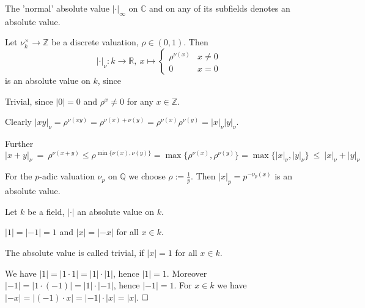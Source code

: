 \documentclass[11pt]{book}
\theoremstyle{nonumberbreak}
\newenvironment{pr}[1][]{\ifthenelse{\equal{#1}{}}{\proof}{\proof[#1]}\rm}{\endproof}
\newenvironment{ex}[1][]{\ifthenelse{\equal{#1}{}}{\example}{\example[#1]}\rm}{\endexample}
\newenvironment{bemdefin}[1][]{\ifthenelse{\equal{#1}{}}{\bemdefini}{\bemdefini[#1]}\rm}{\endbemdefini}
\begin{document}
\begin{spacing}{1.3}
\begin{ex}
\begin{compactenum}
\item The 'normal' absolute value $|\cdot|_{\infty}$ on $\mathbb{C}$ and on any of its subfields denotes an absolute value.
\item Let $\nu_k^{\times} \longrightarrow \mathbb{Z}$ be a discrete valuation, $\rho \in (0,1)$. Then 
$$|\cdot |_{\nu}:k \longrightarrow \mathbb{R}, \ x \mapsto \begin{cases} \rho^{\nu(x)} & x \neq 0 \\ 0 & x=0 \end{cases}$$
is an absolute value on $k$, since
\begin{compactenum}
\item Trivial, since $|0|=0$ and $\rho^x \neq 0$ for any $x \in \mathbb{Z}$.
\item Clearly $|xy|_{\nu}=\rho^{\nu(xy)}=\rho^{\nu(x)+\nu(y)}=\rho^{\nu(x)} \rho^{\nu(y)}=|x|_{\nu}|y|_{\nu}$.
\item Further 
$$|x+y|_{\nu}\ = \ \rho^{\nu(x+y)} \leqslant \rho^{\min\{\nu(x), \nu(y)\}} = \max\{\rho^{\nu(x)}, \rho^{\nu(y)}\}=\max\{|x|_{\nu}, |y|_{\nu}\} \ \leqslant \  |x|_{\nu}+|y|_{\nu}$$
\end{compactenum}
\item For the $p$-adic valuation $\nu_p$ on $\mathbb{Q}$ we choose $\rho:=\frac{1}{p}$. Then $|x|_p=p^{-\nu_p(x)}$ is an absolute value.
\end{compactenum}
\end{ex}

\begin{bemdefin} %
Let $k$ be a field, $|\cdot|$ an absolute value on $k$. 
\begin{compactenum}
\item $|1|=|-1|=1$ and $|x|=|-x|$ for all $x \in k$.
\item The absolute value is called trivial, if $|x|=1$ for all $x \in k$.
\end{compactenum}
\begin{pr}
We have $|1|=|1\cdot 1|=|1| \cdot |1|$, hence $|1|=1$. Moreover $|-1|=|1\cdot (-1)|=|1| \cdot |-1|$, hence $|-1|=1$.
For $x \in k$ we have
$|-x|=|(-1) \cdot x|=|-1| \cdot |x|=|x|$. $\hfill \Box$
\end{pr}
\end{bemdefin}


\end{spacing}
\end{document}
